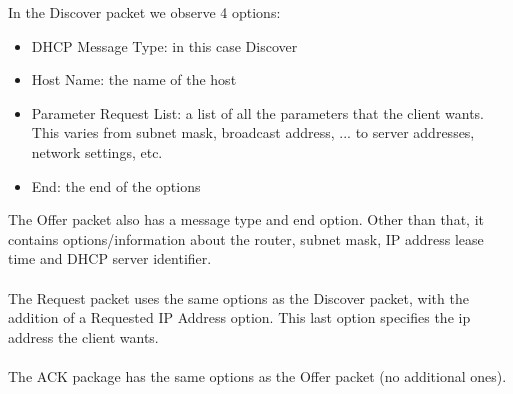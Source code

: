 In the Discover packet we observe 4 options: \\
\begin{itemize}
	\item DHCP Message Type: in this case Discover
	\item Host Name: the name of the host
	\item Parameter Request List: a list of all the parameters that the client wants. This varies from subnet mask, broadcast address, ... to server addresses, network settings, etc.
	\item End: the end of the options
\end{itemize}

The Offer packet also has a message type and end option. Other than that, it contains options/information about the router, subnet mask, IP address lease time and DHCP server identifier. \\ \\

The Request packet uses the same options as the Discover packet, with the addition of a Requested IP Address option. This last option specifies the ip address the client wants. \\ \\

The ACK package has the same options as the Offer packet (no additional ones).

